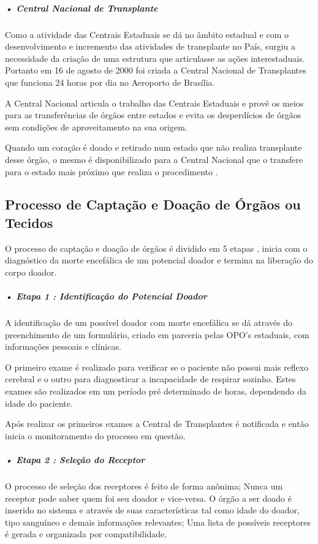 \documentclass[portuguese,oneside]{tcc}
\begin{document}
\subparagraph{• Central Nacional de Transplante}
Como a atividade das Centrais Estaduais se dá no âmbito estadual e com o desenvolvimento e incremento das atividades de transplante no País, surgiu a necessidade da criação de uma estrutura que articulasse as ações interestaduais. Portanto em 16 de agosto de 2000 foi criada a Central Nacional de Transplantes que funciona 24 horas por dia no Aeroporto de Brasília. 

A Central Nacional articula o trabalho das Centrais Estaduais e provê os meios para as transferências de órgãos entre estados e evita os desperdícios de órgãos sem condições de aproveitamento na sua origem. 

Quando um coração é doado e retirado num estado que não realiza transplante desse órgão, o mesmo é disponibilizado para a Central Nacional que o transfere para o estado mais próximo que realiza o procedimento \cite{SCSCT}.

\subsection{Processo de Captação e Doação de Órgãos ou Tecidos} \label{tab:processo-captacao-doacao}
O processo de captação e doação de órgãos é dividido em 5 etapas \cite{EPRECISOEDUCAR}, inicia com o diagnóstico da morte encefálica de um potencial doador e termina na liberação do corpo doador.

\subparagraph{• Etapa 1 : Identificação do Potencial Doador}
A identificação de um possível doador com morte encefálica se dá através do preenchimento de um formulário, criado em parceria pelas OPO’s estaduais, com informações pessoais e clínicas.

O primeiro exame é realizado para verificar se o paciente não possui mais reflexo cerebral e o outro para diagnosticar a incapacidade de respirar sozinho. Estes exames são realizados em um período pré determinado de horas, dependendo da idade do paciente. 

Após realizar os primeiros exames a Central de Transplantes é notificada e então inicia o monitoramento do processo em questão.

\subparagraph{• Etapa 2 : Seleção do Receptor}
O processo de seleção dos receptores é feito de forma anônima; Nunca um receptor pode saber quem foi seu doador e vice-versa. O órgão a ser doado é inserido no sistema e através de suas características tal como idade do doador, tipo sanguíneo e demais informações relevantes; Uma lista de possíveis receptores é gerada e organizada por compatibilidade.
\end{document}
